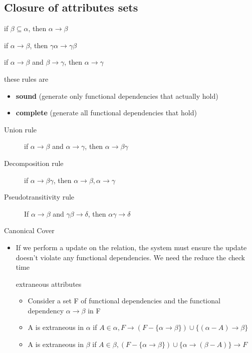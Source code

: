 \documentclass[11pt]{article}
\begin{document}
\subsection{Closure of attributes sets}
\label{sec-13-6}
\begin{description}
\item[{Armstrong's axioms}] \begin{description}
\item[{reflexivity}] if $\beta\subseteq\alpha$, then $\alpha\to\beta$
\item[{augmentation}] if $\alpha\to\beta$, then $\gamma\alpha\to\gamma\beta$
\item[{transitivity}] if $\alpha\to\beta$ and $\beta\to\gamma$, then $\alpha\to\gamma$
\item these rules are
\begin{itemize}
\item \textbf{sound} (generate only functional dependencies that actually hold)
\item \textbf{complete} (generate all functional dependencies that hold)
\end{itemize}
\end{description}
\item[{Another rule}] \begin{description}
\item[{Union rule}] if $\alpha\to\beta$ and $\alpha\to\gamma$, then $\alpha\to\beta\gamma$
\item[{Decomposition rule}] if $\alpha\to\beta\gamma$, then $\alpha\to\beta,\alpha\to\gamma$
\item[{Pseudotransitivity rule}] If $\alpha\to\beta$ and $\gamma\beta\to\delta$, then $\alpha\gamma\to\delta$
\end{description}
\item Canonical Cover
\begin{itemize}
\item If we perform a update on the relation, the system must ensure the
update doesn't violate any functional dependencies. We need the reduce
the check time
\item[{extraneous attributes}] \begin{itemize}
\item Consider a set F of functional dependencies and the functional
dependency $\alpha\to\beta$ in F
\item A is extraneous in $\alpha$ if $A\in\alpha,F\to(F-\{\alpha\to\beta\})\cup\{(\alpha-A)\to\beta\}$
\item A is extraneous in $\beta$ if $A\in\beta, (F-\{\alpha\to\beta\})\cup\{\alpha\to(\beta-A)\}\to F$

\end{itemize}
\end{itemize}
\end{description}
\end{document}
